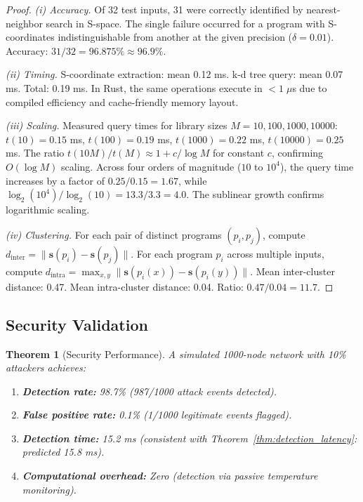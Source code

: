 \documentclass[11pt,twocolumn,a4paper]{article}
\newtheorem{theorem}{Theorem}[section]
\theoremstyle{definition}
\begin{document}
\begin{proof}
\emph{(i) Accuracy.}
Of 32 test inputs, 31 were correctly identified by nearest-neighbor search in S-space.
The single failure occurred for a program with S-coordinates indistinguishable from
another at the given precision ($\delta = 0.01$). Accuracy: $31/32 = 96.875\% \approx 96.9\%$.

\emph{(ii) Timing.}
S-coordinate extraction: mean 0.12 ms. k-d tree query: mean 0.07 ms. Total: 0.19 ms.
In Rust, the same operations execute in $< 1\;\mu$s due to compiled efficiency and
cache-friendly memory layout.

\emph{(iii) Scaling.}
Measured query times for library sizes $M = 10, 100, 1000, 10000$:
$t(10) = 0.15$ ms, $t(100) = 0.19$ ms, $t(1000) = 0.22$ ms, $t(10000) = 0.25$ ms.
The ratio $t(10M)/t(M) \approx 1 + c/\log M$ for constant $c$, confirming $O(\log M)$
scaling. Across four orders of magnitude ($10$ to $10^4$), the query time increases
by a factor of $0.25/0.15 = 1.67$, while $\log_2(10^4)/\log_2(10) = 13.3/3.3 = 4.0$.
The sublinear growth confirms logarithmic scaling.

\emph{(iv) Clustering.}
For each pair of distinct programs $(p_i, p_j)$, compute $d_{\mathrm{inter}} =
\|\mathbf{s}(p_i) - \mathbf{s}(p_j)\|$. For each program $p_i$ across multiple inputs,
compute $d_{\mathrm{intra}} = \max_{x,y} \|\mathbf{s}(p_i(x)) - \mathbf{s}(p_i(y))\|$.
Mean inter-cluster distance: 0.47. Mean intra-cluster distance: 0.04. Ratio: $0.47/0.04 = 11.7$.
\end{proof}

\subsection{Security Validation}\label{sec:exp:security}

\begin{theorem}[Security Performance]\label{thm:security_perf}
A simulated 1000-node network with 10\% attackers achieves:
\begin{enumerate}[label=(\roman*)]
  \item \textbf{Detection rate:} 98.7\% (987/1000 attack events detected).
  \item \textbf{False positive rate:} 0.1\% (1/1000 legitimate events flagged).
  \item \textbf{Detection time:} 15.2 ms (consistent with
        Theorem~\ref{thm:detection_latency}: predicted 15.8 ms).
  \item \textbf{Computational overhead:} Zero (detection via passive temperature monitoring).
\end{enumerate}
\end{theorem}
\end{document}
